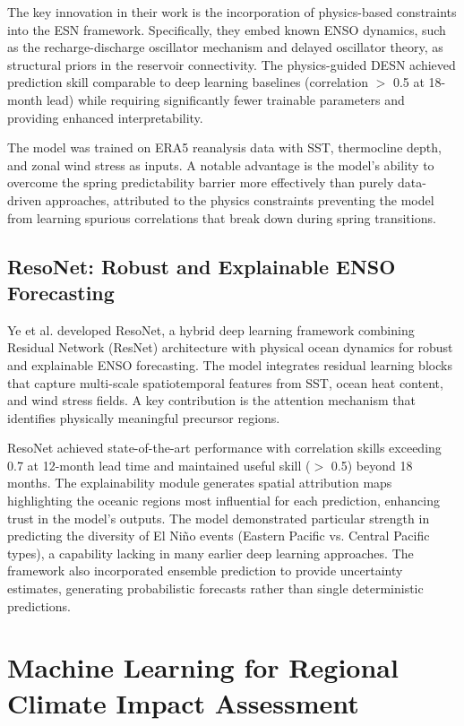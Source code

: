 The key innovation in their work is the incorporation of physics-based constraints into the ESN framework. Specifically, they embed known ENSO dynamics, such as the recharge-discharge oscillator mechanism and delayed oscillator theory, as structural priors in the reservoir connectivity. The physics-guided DESN achieved prediction skill comparable to deep learning baselines (correlation $>$ 0.5 at 18-month lead) while requiring significantly fewer trainable parameters and providing enhanced interpretability.

The model was trained on ERA5 reanalysis data with SST, thermocline depth, and zonal wind stress as inputs. A notable advantage is the model's ability to overcome the spring predictability barrier more effectively than purely data-driven approaches, attributed to the physics constraints preventing the model from learning spurious correlations that break down during spring transitions.

\subsection{ResoNet: Robust and Explainable ENSO Forecasting}

Ye et al. \cite{ye2024resonet} developed ResoNet, a hybrid deep learning framework combining Residual Network (ResNet) architecture with physical ocean dynamics for robust and explainable ENSO forecasting. The model integrates residual learning blocks that capture multi-scale spatiotemporal features from SST, ocean heat content, and wind stress fields. A key contribution is the attention mechanism that identifies physically meaningful precursor regions.

ResoNet achieved state-of-the-art performance with correlation skills exceeding 0.7 at 12-month lead time and maintained useful skill ($>$ 0.5) beyond 18 months. The explainability module generates spatial attribution maps highlighting the oceanic regions most influential for each prediction, enhancing trust in the model's outputs. The model demonstrated particular strength in predicting the diversity of El Ni\~{n}o events (Eastern Pacific vs. Central Pacific types), a capability lacking in many earlier deep learning approaches. The framework also incorporated ensemble prediction to provide uncertainty estimates, generating probabilistic forecasts rather than single deterministic predictions.

\section{Machine Learning for Regional Climate Impact Assessment}

